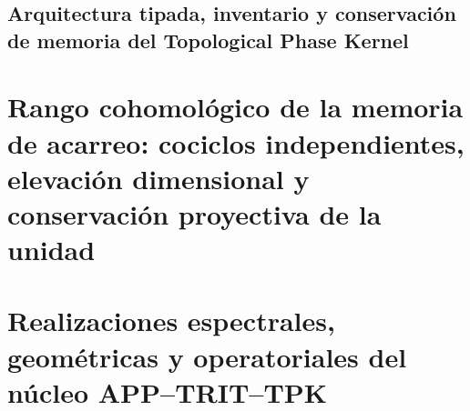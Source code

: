 \section{Arquitectura tipada, inventario y conservación de memoria del Topological Phase Kernel}
\label{sec:sucesor-102-propietarios-tpk}
\begin{HMTScientificOwnerSubordinated}


\end{HMTScientificOwnerSubordinated}
\begin{HMTScientificOwnerSubordinated}

\end{HMTScientificOwnerSubordinated}















\chapter{Rango cohomológico de la memoria de acarreo: cociclos independientes, elevación dimensional y conservación proyectiva de la unidad}
\label{chap:sucesor-102-02}
\begin{HMTScientificOwnerSubordinated}

\end{HMTScientificOwnerSubordinated}

\chapter{Realizaciones espectrales, geométricas y operatoriales del núcleo APP–TRIT–TPK}
\label{chap:sucesor-102-03}

\label{owner:sucesor-102-03k-genealogia-operaciones}






